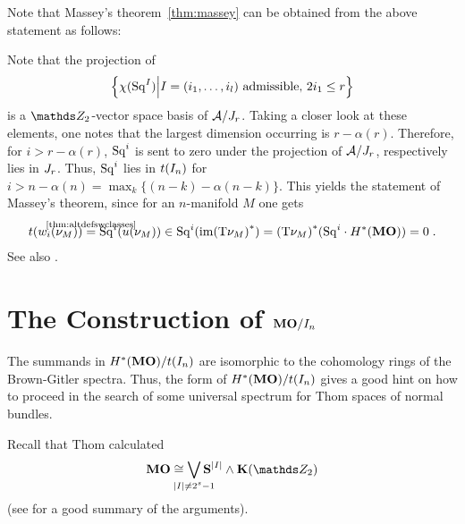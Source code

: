 Note that Massey's theorem~\ref{thm:massey} can be obtained
from the above statement as follows:
\begin{Rem*}
  Note that the projection of
  \begin{gather*}
    \left\{
      \chi(\mathrm{Sq}^{I}) \middle|
      I=(i_1,\dotsc,i_l) \text{ admissible, } 2i_1\leq r
    \right\}
  \end{gather*}
  is a $\Zmod2$-vector space basis of $\mathcal{A}/J_{r}$.
  Taking a closer look at these elements, one notes that the
  largest dimension occurring is $r-\alpha(r)$.
  Therefore, for $i>r-\alpha(r)$, $\mathrm{Sq}^{i}$ is sent to zero under the
  projection of $\mathcal{A}/J_{r}$, respectively lies in $J_{r}$.
  Thus, $\mathrm{Sq}^{i}$ lies in $t(I_{n})$ for
  $i>n-\alpha(n)=\max_k\{(n-k)-\alpha(n-k)\}$.
  This yields the statement of Massey's theorem, since for an
  $n$-manifold $M$ one gets
  \begin{gather*}
    \thomiso(\w{i}{\N M})
    \cequalsby{\ref{thm:altdefswclasses}} \Sq i(\u{\N M})
    \in \Sq i(\Im\pb{(\T{\N M})})
    = \pb{(\T{\N M})} (\Sq i\cdot \H^*(\MOspec))
    = 0
    \;.
  \end{gather*}
  See also \cite[p.~93]{immersionconj}.
\end{Rem*}

\section*{The Construction of $\bm{\mathrm{MO}}/I_{n}$}
The summands in $H^*(\bm{\mathrm{MO}})/t(I_{n})$ are isomorphic to the
cohomology rings of the Brown-Gitler spectra.
Thus, the form of $H^*(\bm{\mathrm{MO}})/t(I_{n})$ gives a good hint on how
to proceed in the search of some universal spectrum for Thom spaces of
normal bundles.

\begin{Rem*}
  Recall that Thom calculated
  \begin{gather*}
    \MOspec
    \cong \bigvee_{\mathclap{\Deg{I}\neq 2^s-1}}
    \Spherespec{\Deg{I}} \smashprod \EMspec
  \end{gather*}
  (see \cite[p.~81f]{immersionconj} for a good summary of the arguments).
\end{Rem*}

